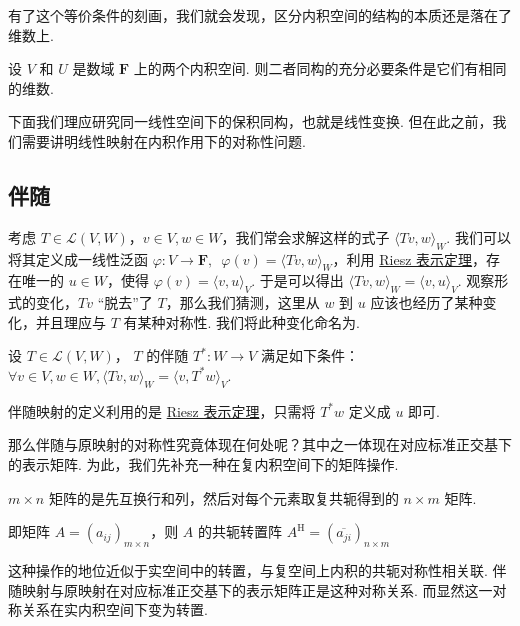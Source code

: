 有了这个等价条件的刻画，我们就会发现，区分内积空间的结构的本质还是落在了维数上.

\begin{theorem}
    设 $ V $ 和 $ U $ 是数域 $ \mathbf{F} $ 上的两个内积空间. 则二者同构的充分必要条件是它们有相同的维数.
\end{theorem}

下面我们理应研究同一线性空间下的保积同构，也就是线性变换. 但在此之前，我们需要讲明线性映射在内积作用下的对称性问题.

\subsection{伴随}

考虑 $ T \in \mathcal{L}(V, W) $，$ v \in V, w \in W $，我们常会求解这样的式子 $ \langle Tv, w \rangle_W $. 我们可以将其定义成一线性泛函 $ \varphi : V \rightarrow \mathbf{F}, \enspace \varphi (v) = \langle Tv, w \rangle_W $，利用 \hyperref[thm:23:Riesz]{Riesz 表示定理}，存在唯一的 $ u \in W $，使得 $ \varphi (v) = \langle v, u \rangle_V $. 于是可以得出 $ \langle Tv, w \rangle_W = \langle v, u \rangle_V $. 观察形式的变化，$ Tv $ “脱去”了 $ T $，那么我们猜测，这里从 $ w $ 到 $ u $ 应该也经历了某种变化，并且理应与 $ T $ 有某种对称性. 我们将此种变化命名为.

\begin{definition}[伴随] 
    设 $ T \in \mathcal{L}(V, W) $， $ T $ 的伴随 $ T^*: W \rightarrow V $ 满足如下条件： $ \forall v \in V, w \in W, \langle Tv, w \rangle_W = \langle v, T^*w \rangle_V $.
\end{definition}

伴随映射的定义利用的是 \hyperref[thm:23:Riesz]{Riesz 表示定理}，只需将 $ T^*w $ 定义成 $ u $ 即可.

那么伴随与原映射的对称性究竟体现在何处呢？其中之一体现在对应标准正交基下的表示矩阵. 为此，我们先补充一种在复内积空间下的矩阵操作.

\begin{definition}[共轭转置] 
    $ m \times n $ 矩阵的是先互换行和列，然后对每个元素取复共轭得到的 $ n \times m $ 矩阵.

    即矩阵 $ A = (a_{ij})_{m \times n} $，则 $ A $ 的共轭转置阵 $ A^{\mathrm{H}} = (\overline{a_{ji}})_{n \times m} $
\end{definition}

这种操作的地位近似于实空间中的转置，与复空间上内积的共轭对称性相关联. 伴随映射与原映射在对应标准正交基下的表示矩阵正是这种对称关系. 而显然这一对称关系在实内积空间下变为转置.

